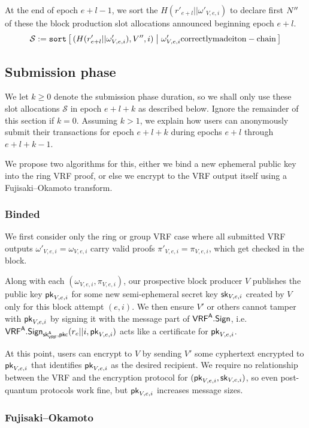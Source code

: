 At the end of epoch $e+l-1$, we sort the $H(r'_{e+l} || \omega'_{V,e,i})$ to declare first $N''$ of these the block production slot allocations announced beginning epoch $e+l$.  
$$ \mathcal{S} := \mathtt{sort} \Listst{ 
  (H(r'_{e+l} || \omega'_{V,e,i}),V'',i) 
}{ 
  \omega'_{V,e,i} \mathrm{ correctly made it on-chain}
} $$


\subsection{Submission phase}\label{subsec:submission_phase}

We let $k \ge 0$ denote the submission phase duration, so we shall only use these slot allocations $\mathcal{S}$ in epoch $e+l+k$ as described below.  Ignore the remainder of this section if $k=0$.  Assuming $k>1$, we explain how users can anonymously submit their transactions for epoch $e+l+k$ during epochs $e+l$ through $e+l+k-1$.

We propose two algorithms for this, either we bind a new ephemeral public key into the ring VRF proof, or else we encrypt to the VRF output itself using a Fujisaki–Okamoto transform. 

\subsubsection{Binded}

We first consider only the ring or group VRF case where all submitted VRF outputs $\omega'_{V,e,i} = \omega_{V,e,i}$ carry valid proofs $\pi'_{V,e,i} = \pi_{V,e,i}$, which get checked in the block.  

Along with each $(\omega_{V,e,i},\pi_{V,e,i})$, our prospective block producer $V$ publishes the public key $\mathsf{pk}_{V,e,i}$ for some new semi-ephemeral secret key $\mathsf{sk}_{V,e,i}$ created by $V$ only for this block attempt $(e,i)$.  We then ensure $V'$ or others cannot tamper with $\mathsf{pk}_{V,e,i}$ by signing it with the message part of $\mathsf{VRF}^{\mathsf{A}}.\mathsf{Sign}$, i.e.\ $\mathsf{VRF}^{\mathsf{A}}.\mathsf{Sign}_{\mathsf{sk}_{\mathsf{VRF}}^{\mathsf{A}},\mathsf{pkc}}(r_e || i, \mathsf{pk}_{V,e,i})$ acts like a certificate for $\mathsf{pk}_{V,e,i}$.

At this point, users can encrypt to $V$ by sending $V'$ some cyphertext encrypted to $\mathsf{pk}_{V,e,i}$ that identifies $\mathsf{pk}_{V,e,i}$ as the desired recipient.  We require no relationship between the VRF and the encryption protocol for $(\mathsf{pk}_{V,e,i},\mathsf{sk}_{V,e,i})$, so even post-quantum protocols work fine, but $\mathsf{pk}_{V,e,i}$ increases message sizes.

\subsubsection{Fujisaki–Okamoto}

